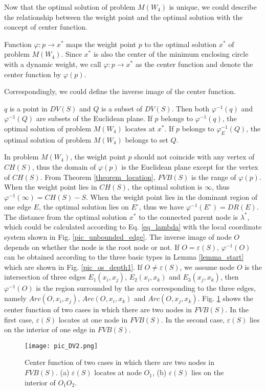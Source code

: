 \documentclass[final,3p,times]{elsarticle}
\begin{document}
Now that the optimal solution of problem $M(W_4)$ is unique, we could describe the relationship between the weight point and the optimal solution with the concept of center function.
\begin{defn}
Function $\varphi:p\rightarrow x^*$ maps the weight point $p$ to the optimal solution $x^*$ of problem $M(W_4)$. Since $x^*$ is also the center of the minimum enclosing circle with a dynamic weight, we call $\varphi:p\rightarrow x^*$ as the center function and denote the center function by $\varphi(p)$.
\end{defn}
Correspondingly, we could define the inverse image of the center function.
\begin{defn}
$q$ is a point in $DV(S)$ and $Q$ is a subset of $DV(S)$. Then both $\varphi^{-1}(q)$ and $\varphi^{-1}(Q)$ are subsets of the Euclidean plane. If $p$ belongs to $\varphi^{-1}(q)$, the optimal solution of problem $M(W_4)$ locates at $x^*$. If $p$ belongs to $\varphi^{-1}_E(Q)$, the optimal solution of problem $M(W_4)$ belongs to set $Q$.
\end{defn}
In problem $M(W_4)$, the weight point $p$ should not coincide with any vertex of $CH(S)$, thus the domain of $\varphi(p)$ is the Euclidean plane except for the vertex of $CH(S)$. From Theorem \ref{theorem_location}, $FVB(S)$ is the range of $\varphi(p)$. When the weight point lies in $CH(S)$, the optimal solution is $\infty$, thus $\varphi^{-1}(\infty)=CH(S)-S$. When the weight point lies in the dominant region of one edge $E$, the optimal solution lies on $E^\circ$, thus we have $\varphi^{-1}(E^\circ)=DR(E)$. The distance from the optimal solution $x^*$ to the connected parent node is $\lambda^*$, which could be calculated according to Eq. \eqref{eq_lambda} with the local coordinate system shown in Fig. \ref{pic_unbounded_edge}. The inverse image of node $O$ depends on whether the node is the root node or not. If $O=\varepsilon(S)$, $\varphi^{-1}(O)$ can be obtained according to the three basic types in Lemma \ref{lemma_start} which are shown in Fig. \ref{pic_os_depth1}. If $O\neq\varepsilon(S)$, we assume node $O$ is the intersection of three edges $E_1(x_i,x_j)$, $E_2(x_i,x_k)$ and $E_3(x_j,x_k)$, then $\varphi^{-1}(O)$ is the region surrounded by the arcs corresponding to the three edges, namely $Arc(O,x_i,x_j)$, $Arc(O,x_i,x_k)$ and $Arc(O,x_j,x_k)$. Fig. \ref{pic_cf_twonodes} shows the center function of two cases in which there are two nodes in $FVB(S)$. In the first case, $\varepsilon(S)$ locates at one node in $FVB(S)$. In the second case, $\varepsilon(S)$ lies on the interior of one edge in $FVB(S)$.
\begin{figure}
    \centering
    \texttt{[image: pic\_DV2.png]}
    \caption{Center function of two cases in which there are two nodes in $FVB(S)$. (a) $\varepsilon(S)$ locates at node $O_1$, (b) $\varepsilon(S)$ lies on the interior of $O_1O_2$.}
    \label{pic_cf_twonodes}
\end{figure}
\end{document}
